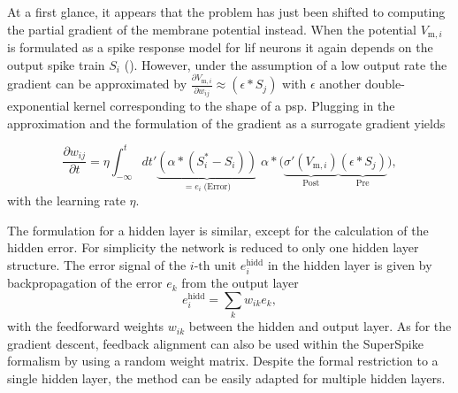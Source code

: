 At a first glance, it appears that the problem has just been shifted to computing the partial gradient of the membrane potential instead. When the potential $V_{\text{m},i}$ is formulated as a spike response model for \gls{lif} neurons it again depends on the output spike train $S_i$ (\citealp{gerstner2014dynamics}). However, under the assumption of a low output rate the gradient can be approximated by $\frac{\partial V_{\text{m},i}}{\partial w_{ij}} \approx (\epsilon \ast S_j)$ with $\epsilon$ another double-exponential kernel corresponding to the shape of a \gls{psp}. Plugging in the approximation and the formulation of the gradient as a surrogate gradient yields

\begin{equation}
\frac{\partial w_{ij}}{\partial t} = \eta \int_{-\infty}^{t} dt'
\underbrace{\left(\alpha \ast (S^*_i - S_i)\right)}_{= e_i \; \text{(Error)}} 
\; \alpha \ast 
\Big(\underbrace{\sigma'(V_{\text{m},i})}_{\text{Post}} 
\underbrace{\left(\epsilon \ast S_j\right)}_{\text{Pre}}\Big),
\label{superspikeweightupdateeq}
\end{equation}
with the learning rate $\eta$. 

The formulation for a hidden layer is similar, except for the calculation of the hidden error. For simplicity the network is reduced to only one hidden layer structure. The error signal of the $i \text{-th}$ unit $e^\text{hidd}_i$ in the hidden layer is given by backpropagation of the error $e_k$ from the output layer
\begin{equation*}
e^\text{hidd}_i = \sum_{k} w_{ik} e_k,
\end{equation*}
with the feedforward weights $w_{ik}$ between the hidden and output layer. As for the gradient descent, feedback alignment can also be used within the SuperSpike formalism by using a random weight matrix. Despite the formal restriction to a single hidden layer, the method can be easily adapted for multiple hidden layers.


